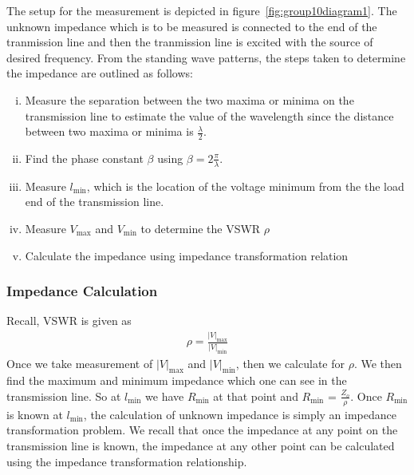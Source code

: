 The setup for the measurement is depicted in figure~\ref{fig:group10diagram1}. The unknown impedance which is to be measured is connected to the end of the tranmission line and then the tranmission line is excited with the source of desired frequency. From the standing wave patterns, the steps taken to determine the impedance are outlined as follows:
\begin{enumerate}[(i)]
\item Measure the separation between the two maxima or minima on the transmission line to estimate the value of the wavelength since the distance between two maxima or minima is $\frac{\lambda}{2}$.
\item Find the phase constant $\beta$ using $\beta = 2\frac{\pi}{\lambda}$.
\item Measure $l_\min$, which is the location of the voltage minimum from the the load end of the transmission line.
\item Measure $V_\max$ and $V_\min$ to determine the VSWR $\rho$
\item Calculate the impedance using impedance transformation relation
\end{enumerate}

\subsubsection{Impedance Calculation}
Recall, VSWR is given as
\begin{align}
\rho = \frac{|V|_\max}{|V|_\min}
\end{align}
Once we take measurement of $|V|_\max$ and $|V|_\min$, then we calculate for $ \rho $. We then find the maximum and minimum impedance which one can see in the transmission line. So at $l_\min$ we have $R_\min$ at that point and $R_\min$ = $\frac{Z_o}{\rho}$. Once $R_\min$ is known at $l_\min$, the calculation of unknown impedance is simply an impedance transformation problem. We recall that once the impedance at any point on the transmission line is known, the impedance at any other point can be calculated using the impedance transformation relationship.

